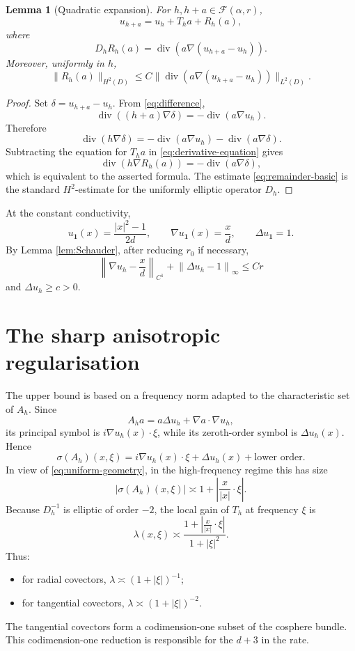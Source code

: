 \documentclass[11pt,a4paper]{article}
\newtheorem{lemma}[theorem]{Lemma}
\theoremstyle{remark}
\numberwithin{equation}{section}
\newcommand{\bone}{\mathbf 1}
\newcommand{\Div}{\operatorname{div}}
\newcommand{\Fcal}{\mathcal F}
\newcommand{\abs}[1]{\left|#1\right|}
\begin{document}
\begin{lemma}[Quadratic expansion]\label{lem:Taylor}
For $h,h+a\in\Fcal(\alpha,r)$,
\[
u_{h+a}=u_h+T_ha+R_h(a),
\]
where
\[
D_hR_h(a)=\Div(a\nabla(u_{h+a}-u_h)).
\]
Moreover, uniformly in $h$,
\begin{equation}\label{eq:remainder-basic}
\|R_h(a)\|_{H^2(D)}
\leq
C\|\Div(a\nabla(u_{h+a}-u_h))\|_{L^2(D)}.
\end{equation}
\end{lemma}

\begin{proof}
Set $\delta=u_{h+a}-u_h$. From \eqref{eq:difference},
\[
\Div((h+a)\nabla\delta)=-\Div(a\nabla u_h).
\]
Therefore
\[
\Div(h\nabla\delta)
=
-\Div(a\nabla u_h)-\Div(a\nabla\delta).
\]
Subtracting the equation for $T_ha$ in \eqref{eq:derivative-equation} gives
\[
\Div(h\nabla R_h(a))=-\Div(a\nabla\delta),
\]
which is equivalent to the asserted formula. The estimate
\eqref{eq:remainder-basic} is the standard $H^2$-estimate for the uniformly
elliptic operator $D_h$.
\end{proof}

At the constant conductivity,
\begin{equation}\label{eq:u-one}
u_{\bone}(x)=\frac{|x|^2-1}{2d},
\qquad
\nabla u_{\bone}(x)=\frac{x}{d},
\qquad
\Delta u_{\bone}=1.
\end{equation}
By Lemma \ref{lem:Schauder}, after reducing $r_0$ if necessary,
\begin{equation}\label{eq:uniform-geometry}
\left\|\nabla u_h-\frac{x}{d}\right\|_{C^1}
+\left\|\Delta u_h-1\right\|_\infty
\leq Cr
\end{equation}
and $\Delta u_h\geq c>0$.

\section{The sharp anisotropic regularisation}

The upper bound is based on a frequency norm adapted to the characteristic
set of $A_h$. Since
\[
A_ha=a\Delta u_h+\nabla a\cdot\nabla u_h,
\]
its principal symbol is $i\nabla u_h(x)\cdot\xi$, while its zeroth-order
symbol is $\Delta u_h(x)$. Hence
\[
\sigma(A_h)(x,\xi)
=
i\nabla u_h(x)\cdot\xi+\Delta u_h(x)+\text{lower order}.
\]
In view of \eqref{eq:uniform-geometry}, in the high-frequency regime this has
size
\[
\abs{\sigma(A_h)(x,\xi)}
\asymp
1+\abs{\frac{x}{|x|}\cdot\xi}.
\]
Because $D_h^{-1}$ is elliptic of order $-2$, the local gain of $T_h$ at
frequency $\xi$ is
\begin{equation}\label{eq:lambda-symbol}
\lambda(x,\xi)
\asymp
\frac{1+\abs{\frac{x}{|x|}\cdot\xi}}{1+|\xi|^2}.
\end{equation}
Thus:
\begin{itemize}
\item for radial covectors, $\lambda\asymp (1+|\xi|)^{-1}$;
\item for tangential covectors, $\lambda\asymp (1+|\xi|)^{-2}$.
\end{itemize}
The tangential covectors form a codimension-one subset of the cosphere
bundle. This codimension-one reduction is responsible for the $d+3$ in the
rate.
\end{document}
